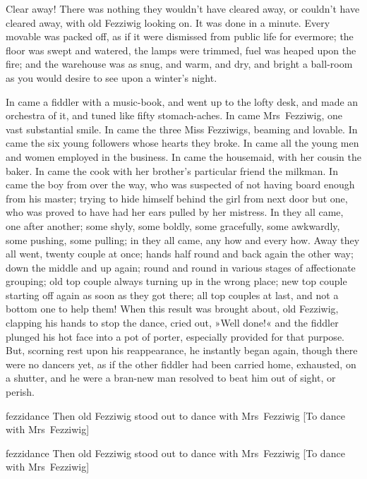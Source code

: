 Clear away! There was nothing they wouldn't have cleared away, or couldn't have cleared away, with old Fezziwig looking on. It was done in a minute. Every movable was packed off, as if it were dismissed from public life for evermore; the floor was swept and watered, the lamps were trimmed, fuel was heaped upon the fire; and the warehouse was as snug, and warm, and dry, and bright a ball-room as you would desire to see upon a winter's night.

In came a fiddler with a music-book, and went up to the lofty desk, and made an orchestra of it, and tuned like fifty stomach-aches. In came Mrs~Fezziwig, one vast substantial smile. In came the three Miss Fezziwigs, beaming and lovable. In came the six young followers whose hearts they broke. In came all the young men and women employed in the business. In came the housemaid, with her cousin the baker. In came the cook with her broth\-er's particular friend the milkman. In came the boy from over the way, who was suspected of not having board enough from his master; trying to hide himself behind the girl from next door but one, who was proved to have had her ears pulled by her mistress. In they all came, one after another; some shyly, some boldly, some gracefully, some awkwardly, some pushing, some pulling; in they all came, any how and every how. Away they all went, twenty couple at once; hands half round and back again the other way; down the middle and up again; round and round in various stages of affectionate grouping; old top couple always turning up in the wrong place; new top couple starting off again as soon as they got there; all top couples at last, and not a bottom one to help them! When this result was brought about, old Fezziwig, clapping his hands to stop the dance, cried out, »Well done!« and the fiddler plunged his hot face into a pot of porter, especially provided for that purpose. But, scorning rest upon his reappearance, he instantly began again, though there were no dancers yet, as if the other fiddler had been carried home, exhausted, on a shutter, and he were a bran-new man resolved to beat him out of sight, or perish.

\begin{letter}
\begin{colorbigpic}
	[1.2]
	{fezzidance}
	{Then old Fezziwig stood out to dance with Mrs~Fezziwig}
	[To dance with Mrs~Fezziwig]
\end{colorbigpic}
\end{letter}

\begin{a4}
\begin{colorbigpic}
	[1.1]
	{fezzidance}
	{Then old Fezziwig stood out to dance with Mrs~Fezziwig}
	[To dance with Mrs~Fezziwig]
\end{colorbigpic}
\end{a4}

